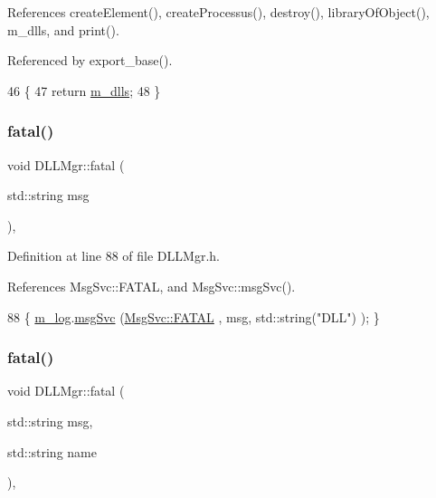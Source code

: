 References create\+Element(), create\+Processus(), destroy(), library\+Of\+Object(), m\+\_\+dlls, and print().



Referenced by export\+\_\+base().


\begin{DoxyCode}
46   \{
47     \textcolor{keywordflow}{return} \hyperlink{classDLLMgr_a5bd713edea21d64f32aa71162bca581a}{m\_dlls};
48   \}
\end{DoxyCode}
\mbox{\label{classDLLMgr_ac45919d4588b964a7ca3a8e2abed3cc2}} 
\subsubsection{\texorpdfstring{fatal()}{fatal()}\hspace{0.1cm}{\footnotesize\ttfamily [1/2]}}
{\footnotesize\ttfamily void D\+L\+L\+Mgr\+::fatal (\begin{DoxyParamCaption}\item[{std\+::string}]{msg }\end{DoxyParamCaption})\hspace{0.3cm}{\ttfamily [inline]}, {\ttfamily [private]}}



Definition at line 88 of file D\+L\+L\+Mgr.\+h.



References Msg\+Svc\+::\+F\+A\+T\+AL, and Msg\+Svc\+::msg\+Svc().


\begin{DoxyCode}
88 \{ \hyperlink{classDLLMgr_a64b523faed64378451ee76f6fbf0800d}{m\_log}.\hyperlink{classMsgSvc_ad25f18047920cc59a314e5098259711c}{msgSvc} (\hyperlink{classMsgSvc_ae671eb7301996cd049d2da8a65925926a59c73cb29edfc9cdf35845e2b1301363}{MsgSvc::FATAL}   , msg, std::string(\textcolor{stringliteral}{"DLL"}) ); \}
\end{DoxyCode}
\mbox{\label{classDLLMgr_add7f622101c74721181402ba26072668}} 
\subsubsection{\texorpdfstring{fatal()}{fatal()}\hspace{0.1cm}{\footnotesize\ttfamily [2/2]}}
{\footnotesize\ttfamily void D\+L\+L\+Mgr\+::fatal (\begin{DoxyParamCaption}\item[{std\+::string}]{msg,  }\item[{std\+::string}]{name }\end{DoxyParamCaption})\hspace{0.3cm}{\ttfamily [inline]}, {\ttfamily [private]}}



